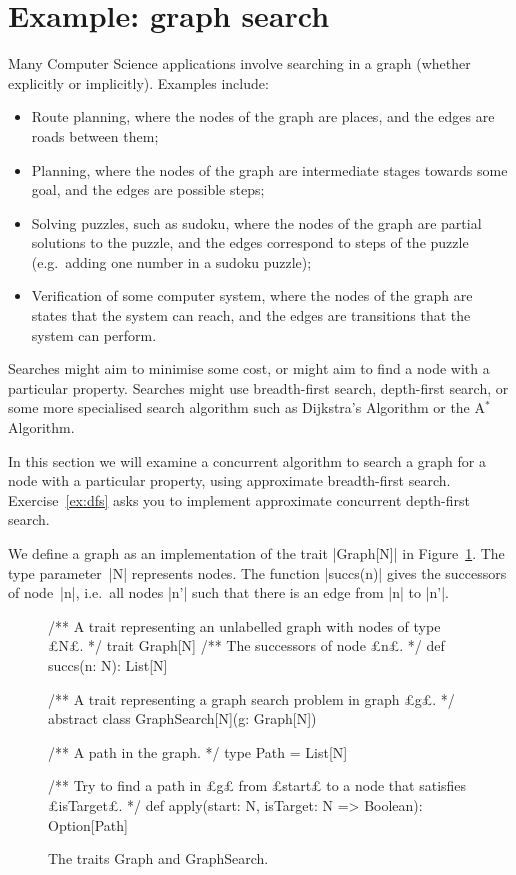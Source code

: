 \section{Example: graph search}
\label{sec:BFS}

Many Computer Science applications involve searching in a graph (whether
explicitly or implicitly).  Examples include:
%
\begin{itemize}
\item Route planning, where the nodes of the graph are places, and the edges
  are roads between them;

\item Planning, where the nodes of the graph are intermediate stages towards
  some goal, and the edges are possible steps;

\item Solving puzzles, such as sudoku, where the nodes of the graph are
  partial solutions to the puzzle, and the edges correspond to steps of the
  puzzle (e.g.~adding one number in a sudoku puzzle);

\item Verification of some computer system, where the nodes of the graph are
  states that the system can reach, and the edges are transitions that the
  system can perform.  
\end{itemize}
%
Searches might aim to minimise some cost, or might aim to find a node with a
particular property.  Searches might use breadth-first search, depth-first
search, or some more specialised search algorithm such as Dijkstra's Algorithm
or the A$^*$ Algorithm.

In this section we will examine a concurrent algorithm to search a graph for a
node with a particular property, using approximate breadth-first search.
Exercise~\ref{ex:dfs} asks you to implement approximate concurrent
depth-first search.

We define a graph as an implementation of the trait |Graph[N]| in
Figure~\ref{fig:graph}.  The type parameter~|N| represents nodes.  The
function |succs(n)| gives the successors of node~|n|, i.e.~all nodes |n'| such
that there is an edge from |n| to |n'|.


\begin{figure}
\begin{scala}
/** A trait representing an unlabelled graph with nodes of type £N£. */
trait Graph[N]{
  /** The successors of node £n£. */
  def succs(n: N): List[N]
}

/** A trait representing a graph search problem in graph £g£. */
abstract class GraphSearch[N](g: Graph[N]){
  /** A path in the graph. */
  type Path = List[N]

  /** Try to find a path in £g£ from £start£ to a node that satisfies £isTarget£. */
  def apply(start: N, isTarget: N => Boolean): Option[Path]
}
\end{scala}
\caption{The traits {\scalashape Graph} and {\scalashape GraphSearch}.}
\label{fig:graph}
\end{figure}

